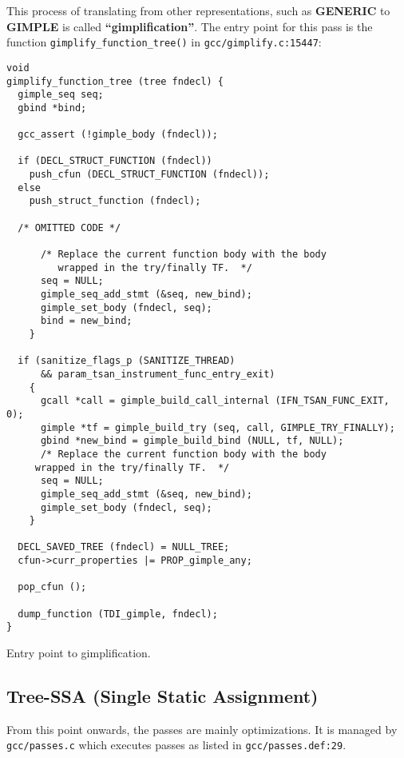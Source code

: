 \documentclass[11pt]{article}
\begin{document}
This process of translating from other representations, such as \textbf{GENERIC} to
\textbf{GIMPLE} is called \textbf{``gimplification''}. The entry point for this pass is the
function \texttt{gimplify\_function\_tree()} in \texttt{gcc/gimplify.c:15447}:

\begin{listing}[H]
\begin{verbatim}
void
gimplify_function_tree (tree fndecl) {
  gimple_seq seq;
  gbind *bind;

  gcc_assert (!gimple_body (fndecl));

  if (DECL_STRUCT_FUNCTION (fndecl))
    push_cfun (DECL_STRUCT_FUNCTION (fndecl));
  else
    push_struct_function (fndecl);

  /* OMITTED CODE */

      /* Replace the current function body with the body
         wrapped in the try/finally TF.  */
      seq = NULL;
      gimple_seq_add_stmt (&seq, new_bind);
      gimple_set_body (fndecl, seq);
      bind = new_bind;
    }

  if (sanitize_flags_p (SANITIZE_THREAD)
      && param_tsan_instrument_func_entry_exit)
    {
      gcall *call = gimple_build_call_internal (IFN_TSAN_FUNC_EXIT, 0);
      gimple *tf = gimple_build_try (seq, call, GIMPLE_TRY_FINALLY);
      gbind *new_bind = gimple_build_bind (NULL, tf, NULL);
      /* Replace the current function body with the body
	 wrapped in the try/finally TF.  */
      seq = NULL;
      gimple_seq_add_stmt (&seq, new_bind);
      gimple_set_body (fndecl, seq);
    }

  DECL_SAVED_TREE (fndecl) = NULL_TREE;
  cfun->curr_properties |= PROP_gimple_any;

  pop_cfun ();

  dump_function (TDI_gimple, fndecl);
}
\end{verbatim}
\caption{Entry point to gimplification.}
\end{listing}
\subsection{Tree-SSA (Single Static Assignment)}
\label{sec:org4b5736c}

From this point onwards, the passes are mainly optimizations. It is managed
by \texttt{gcc/passes.c} which executes passes as listed in \texttt{gcc/passes.def:29}.
\end{document}
